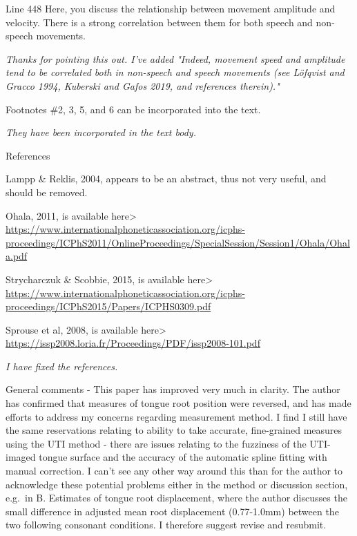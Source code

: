 \documentclass[]{article}
\begin{document}
Line 448 Here, you discuss the relationship between movement amplitude
and velocity. There is a strong correlation between them for both speech
and non-speech movements.

\begin{adjustwidth}{1cm}{} \textit{
Thanks for pointing this out. I've added "Indeed, movement speed and amplitude tend to be correlated both in non-speech and speech movements (see Löfqvist and Gracco 1994, Kuberski and Gafos 2019, and references therein)."
} \end{adjustwidth}

Footnotes \#2, 3, 5, and 6 can be incorporated into the text.

\begin{adjustwidth}{1cm}{} \textit{
They have been incorporated in the text body.
} \end{adjustwidth}

References

Lampp \& Reklis, 2004, appears to be an abstract, thus not very useful,
and should be removed.

Ohala, 2011, is available here\textgreater{}
\url{https://www.internationalphoneticassociation.org/icphs-proceedings/ICPhS2011/OnlineProceedings/SpecialSession/Session1/Ohala/Ohala.pdf}

Strycharczuk \& Scobbie, 2015, is available here\textgreater{}
\url{https://www.internationalphoneticassociation.org/icphs-proceedings/ICPhS2015/Papers/ICPHS0309.pdf}

Sprouse et al, 2008, is available here\textgreater{}
\url{https://issp2008.loria.fr/Proceedings/PDF/issp2008-101.pdf}

\begin{adjustwidth}{1cm}{} \textit{
I have fixed the references.
} \end{adjustwidth}

General comments - This paper has improved very much in clarity. The
author has confirmed that measures of tongue root position were
reversed, and has made efforts to address my concerns regarding
measurement method. I find I still have the same reservations relating
to ability to take accurate, fine-grained measures using the UTI method
- there are issues relating to the fuzziness of the UTI-imaged tongue
surface and the accuracy of the automatic spline fitting with manual
correction. I can't see any other way around this than for the author to
acknowledge these potential problems either in the method or discussion
section, e.g.~in B. Estimates of tongue root displacement, where the
author discusses the small difference in adjusted mean root displacement
(0.77-1.0mm) between the two following consonant conditions. I therefore
suggest revise and resubmit.
\end{document}
